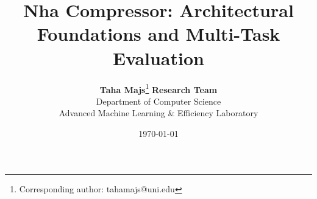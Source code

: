\title{\textbf{Nha Compressor: Architectural Foundations and Multi-Task Evaluation}}

\author{
  \textbf{Taha Majs}\thanks{Corresponding author: tahamajs@uni.edu} \quad \textbf{Research Team} \\
  Department of Computer Science \\
  Advanced Machine Learning \& Efficiency Laboratory
}

\date{\today}

